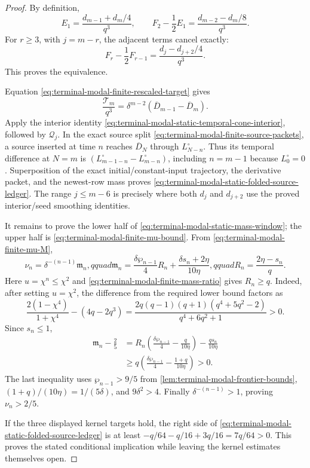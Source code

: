 \begin{proof}
By definition,
\[
 E_1=\frac{d_{m-1}+d_m/4}{q^3},\qquad
 F_2-\frac12E_1=\frac{d_{m-2}-d_m/8}{q^3}.
\]
For $r\ge3$, with $j=m-r$, the adjacent terms cancel exactly:
\[
 F_r-\frac12F_{r-1}
 =\frac{d_j-d_{j+2}/4}{q^3}.
\]
This proves the equivalence.

Equation \eqref{eq:terminal-modal-finite-rescaled-target} gives
\[
 \frac{\mathcal T_m}{q^3}
 =\delta^{m-2}(\overline D_{m-1}-\overline D_m).
\]
Apply the interior identity
\eqref{eq:terminal-modal-static-temporal-cone-interior}, followed by
$\mathcal Q_j$.  In the exact source split
\eqref{eq:terminal-modal-finite-source-packets}, a source inserted at time
$n$ reaches $\overline D_N$ through $L_{N-n}^\circ$.  Thus its temporal
difference at $N=m$ is
$(L_{m-1-n}^\circ-L_{m-n}^\circ)$, including $n=m-1$ because
$L_0^\circ=0$.  Superposition of the exact initial/constant-input trajectory,
the derivative packet, and the newest-row mass proves
\eqref{eq:terminal-modal-static-folded-source-ledger}.  The range
$j\le m-6$ is precisely where both $d_j$ and $d_{j+2}$ use the proved
interior/seed smoothing identities.

It remains to prove the lower half of
\eqref{eq:terminal-modal-static-mass-window}; the upper half is
\eqref{eq:terminal-modal-finite-mu-bound}.  From
\eqref{eq:terminal-modal-finite-mu-M},
\[
 \nu_n=\delta^{-(n-1)}\mathfrak m_n,qquad
 \mathfrak m_n=
 \frac{\delta\wp_{n-1}}4R_n
 +\frac{\delta s_n+2\eta}{10\eta},qquad
 R_n=\frac{2\eta-s_n}{q}.
\]
Here $u=\chi^n\le\chi^2$ and
\eqref{eq:terminal-modal-finite-mass-ratio} gives $R_n\ge q$.  Indeed,
after setting $u=\chi^2$, the difference from the required lower bound
factors as
\[
 \frac{2(1-\chi^4)}{1+\chi^4}-(4q-2q^3)
 =\frac{2q(q-1)(q+1)(q^4+5q^2-2)}{q^4+6q^2+1}>0.
\]
Since $s_n\le1$,
\begin{align*}
 \mathfrak m_n-\frac25
 &=R_n\left(\frac{\delta\wp_{n-1}}4-\frac q{10\eta}\right)
   -\frac{qs_n}{10\eta}\\
 &\ge q\left(\frac{\delta\wp_{n-1}}4-\frac{1+q}{10\eta}\right)>0.
\end{align*}
The last inequality uses $\wp_{n-1}>9/5$ from
\cref{lem:terminal-modal-frontier-bounds},
$(1+q)/(10\eta)=1/(5\delta)$, and $9\delta^2>4$.
Finally $\delta^{-(n-1)}>1$, proving $\nu_n>2/5$.

If the three displayed kernel targets hold, the right side of
\eqref{eq:terminal-modal-static-folded-source-ledger} is at least
$-q/64-q/16+3q/16=7q/64>0$.  This proves the stated conditional
implication while leaving the kernel estimates themselves open.
\end{proof}

